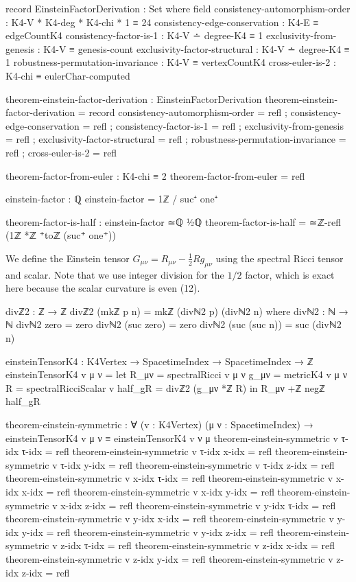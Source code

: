 \documentclass[11pt,a4paper]{book}
\begin{document}
\begin{code}
record EinsteinFactorDerivation : Set where
  field
    consistency-automorphism-order : K4-V * K4-deg * K4-chi * 1 ≡ 24
    consistency-edge-conservation : K4-E ≡ edgeCountK4
    consistency-factor-is-1 : K4-V ∸ degree-K4 ≡ 1
    exclusivity-from-genesis : K4-V ≡ genesis-count
    exclusivity-factor-structural : K4-V ∸ degree-K4 ≡ 1
    robustness-permutation-invariance : K4-V ≡ vertexCountK4
    cross-euler-is-2 : K4-chi ≡ eulerChar-computed

theorem-einstein-factor-derivation : EinsteinFactorDerivation
theorem-einstein-factor-derivation = record
  { consistency-automorphism-order = refl
  ; consistency-edge-conservation = refl
  ; consistency-factor-is-1 = refl
  ; exclusivity-from-genesis = refl
  ; exclusivity-factor-structural = refl
  ; robustness-permutation-invariance = refl
  ; cross-euler-is-2 = refl
  }

\end{code}

\begin{code}
theorem-factor-from-euler : K4-chi ≡ 2
theorem-factor-from-euler = refl

einstein-factor : ℚ
einstein-factor = 1ℤ / suc⁺ one⁺

theorem-factor-is-half : einstein-factor ≃ℚ ½ℚ
theorem-factor-is-half = ≃ℤ-refl (1ℤ *ℤ ⁺toℤ (suc⁺ one⁺))
\end{code}

We define the Einstein tensor $G_{\mu\nu} = R_{\mu\nu} - \frac{1}{2}Rg_{\mu\nu}$ using the spectral Ricci tensor and scalar. Note that we use integer division for the $1/2$ factor, which is exact here because the scalar curvature is even (12).

\begin{code}
divℤ2 : ℤ → ℤ
divℤ2 (mkℤ p n) = mkℤ (divℕ2 p) (divℕ2 n)
  where
  divℕ2 : ℕ → ℕ
  divℕ2 zero = zero
  divℕ2 (suc zero) = zero
  divℕ2 (suc (suc n)) = suc (divℕ2 n)

einsteinTensorK4 : K4Vertex → SpacetimeIndex → SpacetimeIndex → ℤ
einsteinTensorK4 v μ ν = 
  let R_μν = spectralRicci v μ ν
      g_μν = metricK4 v μ ν
      R    = spectralRicciScalar v
      half_gR = divℤ2 (g_μν *ℤ R)
  in R_μν +ℤ negℤ half_gR

theorem-einstein-symmetric : ∀ (v : K4Vertex) (μ ν : SpacetimeIndex) →
                             einsteinTensorK4 v μ ν ≡ einsteinTensorK4 v ν μ
theorem-einstein-symmetric v τ-idx τ-idx = refl
theorem-einstein-symmetric v τ-idx x-idx = refl
theorem-einstein-symmetric v τ-idx y-idx = refl
theorem-einstein-symmetric v τ-idx z-idx = refl
theorem-einstein-symmetric v x-idx τ-idx = refl
theorem-einstein-symmetric v x-idx x-idx = refl
theorem-einstein-symmetric v x-idx y-idx = refl
theorem-einstein-symmetric v x-idx z-idx = refl
theorem-einstein-symmetric v y-idx τ-idx = refl
theorem-einstein-symmetric v y-idx x-idx = refl
theorem-einstein-symmetric v y-idx y-idx = refl
theorem-einstein-symmetric v y-idx z-idx = refl
theorem-einstein-symmetric v z-idx τ-idx = refl
theorem-einstein-symmetric v z-idx x-idx = refl
theorem-einstein-symmetric v z-idx y-idx = refl
theorem-einstein-symmetric v z-idx z-idx = refl
\end{code}
\end{document}
